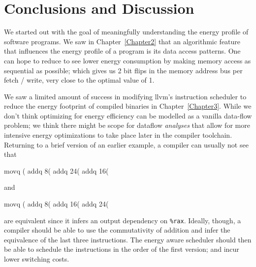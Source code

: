 \chapter{Conclusions and Discussion}

\label{Chapter4}


We started out with the goal of meaningfully understanding the energy
profile of software programs.  We saw in Chapter~\ref{Chapter2} that
an algorithmic feature that influences the energy profile of a program
is its data access patterns.  One can hope to reduce to see lower
energy consumption by making memory access as sequential as possible;
which gives us 2 bit flips in the memory address bus per fetch /
write, very close to the optimal value of 1.

We saw a limited amount of success in modifying llvm's instruction
scheduler to reduce the energy footprint of compiled binaries in
Chapter~\ref{Chapter3}.  While we don't think optimizing for energy
efficiency can be modelled as a vanilla data-flow problem; we think
there might be scope for dataflow \textit{analyses} that allow for
more intensive energy optimizations to take place later in the
compiler toolchain.  Returning to a brief version of an earlier
example, a compiler can usually not see that

\begin{gascode}
  movq    (%
  addq    8(%
  addq    24(%
  addq    16(%
\end{gascode}

and

\begin{gascode}
  movq    (%
  addq    8(%
  addq    16(%
  addq    24(%
\end{gascode}

are equivalent since it infers an output dependency on \texttt{\%rax}.
Ideally, though, a compiler should be able to use the commutativity of
addition and infer the equivalence of the last three instructions.
The energy aware scheduler should then be able to schedule the
instructions in the order of the first version; and incur lower
switching costs.
